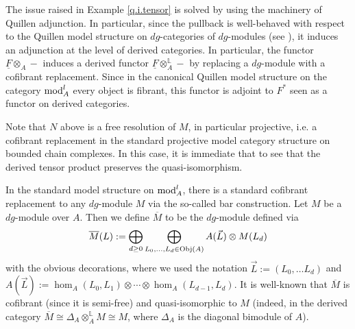 The issue raised in Example \ref{q.i.tensor} is solved by using the machinery of Quillen adjunction. In particular, since the pullback is well-behaved with respect to the Quillen model structure on $dg$-categories of $dg$-modules (see \cite{To:dg-cat}), it induces an adjunction at the level of derived categories. In particular, the functor $\underline{F}\otimes_A -$ induces a derived functor $\underline{F}\otimes_A^\mathbb{L}-$ by replacing a $dg$-module with a cofibrant replacement. Since in the canonical Quillen model structure on the category $\text{mod}^l_A$ every object is fibrant, this functor is adjoint to $F^*$ seen as a functor on derived categories.

\begin{example}
Note that $N$ above is a free resolution of $M$, in particular projective, i.e. a cofibrant replacement in the standard projective model category structure on bounded chain complexes. In this case, it is immediate that to see that the derived tensor product preserves the quasi-isomorphism.
\end{example}

In the standard model structure on $\text{mod}^l_A$, there is a standard cofibrant replacement to any $dg$-module $M$ via the so-called bar construction. Let $M$ be a $dg$-module over $A$. Then we define $\overline{M}$ to be the $dg$-module defined via $$\overline{M}(L):=\bigoplus_{d\geq 0}\bigoplus_{L_0,\ldots, L_d\in \text{Obj}(A)}A(\vec{L})\otimes M(L_d)$$ with the obvious decorations, where we used the notation $\vec{L}:=(L_0,\ldots L_d)$ and $A(\vec{L}):= \hom_A(L_0,L_1)\otimes \cdots \otimes \hom_A(L_{d-1},L_d)$. It is well-known that $\overline{M}$ is cofibrant (since it is semi-free) and quasi-isomorphic to $M$ (indeed, in the derived category $\overline{M}\cong \Delta_A\otimes^{\mathbb{L}}_AM\cong M$, where $\Delta_A$ is the diagonal bimodule of $A$).\\

